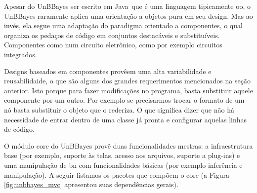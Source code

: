 Apesar do UnBBayes ser escrito em Java\texttrademark\, que é uma linguagem tipicamente \gls{oo}, o UnBBayes raramente aplica uma orientação a objetos pura em seu design. Mas ao invés, ela segue uma adaptação do paradigma orientado a componentes, o qual organiza os pedaços de código em conjuntos destacáveis e substituíveis. Componentes como num circuito eletrônico, como por exemplo circuitos integrados.

Designs baseados em componentes provêem uma alta variabilidade e reusabilidaide, o que são alguns dos grandes requerimentos mencionados na seção anterior. Isto porque para fazer modificações no programa, basta substituir aquele componente por um outro. Por exemplo se precisarmos trocar o formato de um nó basta substituir o objeto que o rederiza. O que significa dizer que não há necessidade de entrar dentro de uma classe já pronta e configurar aquelas linhas de código.

O módulo core do UnBBayes provê duas funcionalidades mestras: a infraestrutura base (por exemplo, suporte às telas, acesso aos arquivos, suporte a plug-ins) e uma manipulação de \gls{bn} com funcionalidades básicas (por exemplo inferência e manipulação). A seguir listamos os pacotes que compõem o core (a Figura \ref{fig:unbbayes_mvc} apresentou suas dependências gerais).

